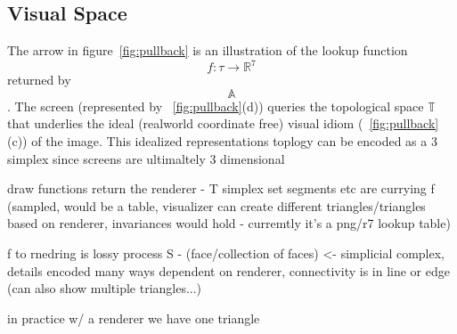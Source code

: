 \documentclass[../intro.tex]{subfiles}
\begin{document}


\subsection{Visual Space}


The arrow in figure~\ref{fig:pullback} is an illustration of the lookup function $$f:\tau \rightarrow \mathbb{R}^7$$ returned by $$\mathbb{A}$$. The screen (represented by ~\ref{fig:pullback}(d)) queries the topological space $\mathbb{T}$ that underlies the ideal (realworld coordinate free) visual idiom (~\ref{fig:pullback}(c)) of the image. This idealized representations toplogy can be encoded as a 3 simplex since screens are ultimaltely 3 dimensional   




draw functions return the renderer - T simplex 
set segments etc are currying f
(sampled, would be a table, visualizer can create different triangles/triangles based on renderer, invariances would hold - curremtly it's a png/r7 lookup table)

f to rnedring is lossy process
S - (face/collection of faces) <- simplicial complex, details encoded many ways dependent on renderer, connectivity is in line or edge (can also show multiple triangles...)

in practice w/ a renderer we have one triangle
\end{document}
